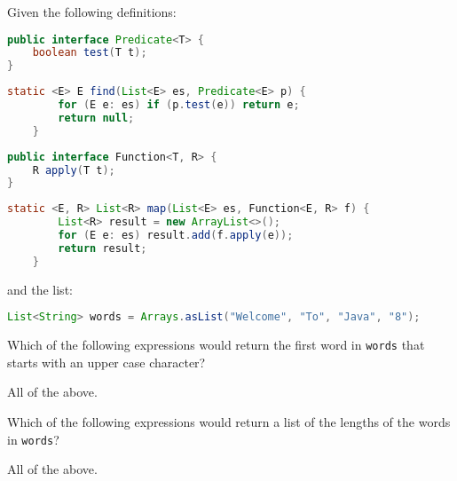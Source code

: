 \documentclass[addpoints,9pt]{exam}
\begin{document}
\begin{questions}
\newpage


Given the following definitions:

\small

\begin{lstlisting}[language=Java]
public interface Predicate<T> {
    boolean test(T t);
}
\end{lstlisting}

\begin{lstlisting}[language=Java]
    static <E> E find(List<E> es, Predicate<E> p) {
        for (E e: es) if (p.test(e)) return e;
        return null;
    }
\end{lstlisting}

\begin{lstlisting}[language=Java]
public interface Function<T, R> {
    R apply(T t);
}
\end{lstlisting}

\begin{lstlisting}[language=Java]
    static <E, R> List<R> map(List<E> es, Function<E, R> f) {
        List<R> result = new ArrayList<>();
        for (E e: es) result.add(f.apply(e));
        return result;
    }
\end{lstlisting}

and the list:
\begin{lstlisting}[language=Java]
List<String> words = Arrays.asList("Welcome", "To", "Java", "8");
\end{lstlisting}

\normalsize

\question[3] Which of the following expressions would return the first word in {\tt words} that starts with an upper case character?

\begin{choices}
\choice All of the above.
\end{choices}

\question[3] Which of the following expressions would return a list of the lengths of the words in {\tt words}?

\begin{choices}
\correctchoice All of the above.
\end{choices}


\end{questions}
\end{document}
